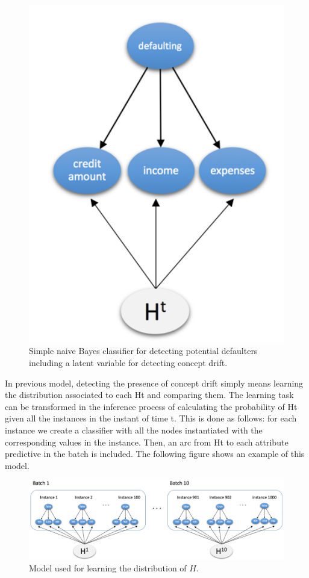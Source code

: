 \documentclass[10pt,a4paper]{article}
\begin{document}
\begin{figure}[h!]
	\centering
	\includegraphics[width=13cm]{img/cd_detector.png}
	\caption{Simple naive Bayes classifier for detecting potential defaulters including a latent variable for detecting concept drift.}
	\label{fig:blog_conceptdrift:what:cd_detector}	
\end{figure}


In previous model, detecting the presence of concept drift simply means learning the distribution associated to each Ht and comparing them. The learning task can be transformed in the inference process of calculating the probability of Ht given all the instances in the instant of time t. This is done as follows: for each instance we create a classifier with all the nodes instantiated with the corresponding values in the instance. Then, an arc from Ht to each attribute predictive in the batch is included. The following figure shows an example of this model.\newline 


\begin{figure}[h!]
	\centering
	\includegraphics[width=15cm]{img/cd_detector2.png}
	\caption{Model used for learning the distribution of $H$.}
	\label{fig:blog_conceptdrift:what:cd_detector2}	
\end{figure}
\end{document}
